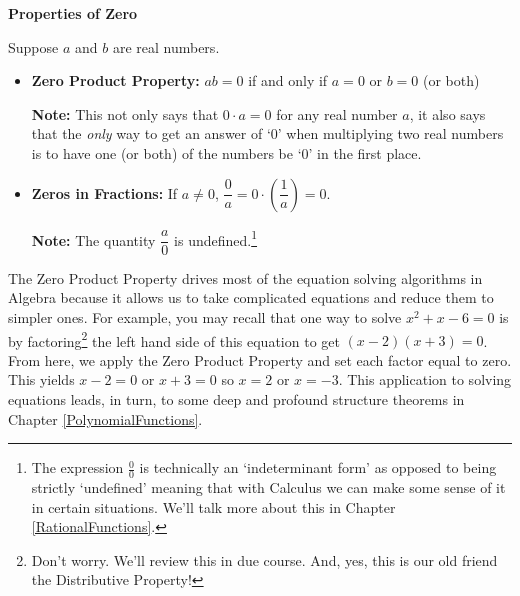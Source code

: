 \colorbox{ResultColor}{\bbm

\centerline{\textbf{Properties of Zero}}

Suppose $a$ and $b$ are real numbers.

\begin{itemize}

\item  \textbf{Zero Product Property:} $ab = 0$ if and only if $a=0$ or $b=0$ (or both)

\textbf{Note:} This not only says that $0 \cdot a = 0$ for any real number $a$, it also says that the \textit{only} way to get an answer of `$0$' when multiplying two real numbers  is to have one (or both) of the numbers be `$0$' in the first place.

\item  \textbf{Zeros in Fractions:}  If $a \neq 0$, $\dfrac{0}{a} = 0 \cdot \left(\dfrac{1}{a}\right) = 0$.

\textbf{Note:}  The quantity $\dfrac{a}{0}$ is undefined.\footnote{The expression $\frac{0}{0}$ is technically an `indeterminant form' as opposed to being strictly `undefined' meaning that with Calculus we can make some sense of it in certain situations.  We'll talk more about this in Chapter \ref{RationalFunctions}.}

\end{itemize}

\ebm}

\pagebreak

The Zero Product Property drives most of the equation solving algorithms in Algebra because it allows us to take complicated equations and reduce them to simpler ones.  For example, you may recall that one way to solve  $x^2+x-6=0$ is by factoring\footnote{Don't worry.  We'll review this in due course.  And, yes, this is our old friend the Distributive Property!} the left hand side of this equation to get  $(x-2)(x+3) = 0$.  From here, we apply the Zero Product Property and set each factor equal to zero.  This yields  $x-2=0$ or $x+3=0$ so $x=2$ or $x=-3$.  This application to solving equations leads, in turn,  to some deep and profound structure theorems in Chapter \ref{PolynomialFunctions}. 

\medskip

